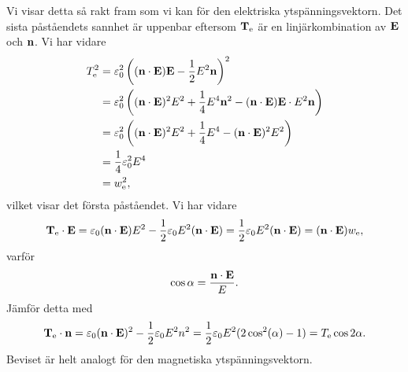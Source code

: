 Vi visar detta så rakt fram som vi kan för den elektriska ytspänningsvektorn. Det sista påståendets sannhet är uppenbar eftersom $\vb{T}_{\text{e}}$ är en linjärkombination av $\vb{E}$ och $\vb{n}$. Vi har vidare
\begin{align*}
	T_{\text{e}}^{2} &= \varepsilon_{0}^{2}\left((\vb{n}\cdot\vb{E})\vb{E} - \frac{1}{2}E^{2}\vb{n}\right)^{2} \\
	                 &= \varepsilon_{0}^{2}\left((\vb{n}\cdot\vb{E})^{2}E^{2} + \frac{1}{4}E^{4}\vb{n}^{2} - (\vb{n}\cdot\vb{E})\vb{E}\cdot E^{2}\vb{n}\right) \\
	                 &= \varepsilon_{0}^{2}\left((\vb{n}\cdot\vb{E})^{2}E^{2} + \frac{1}{4}E^{4} - (\vb{n}\cdot\vb{E})^{2}E^{2}\right) \\
	                 &= \frac{1}{4}\varepsilon_{0}^{2}E^{4} \\
	                 &= w_{\text{e}}^{2},
\end{align*}
vilket visar det första påståendet. Vi har vidare
\begin{align*}
	\vb{T}_{\text{e}}\cdot\vb{E} = \varepsilon_{0}(\vb{n}\cdot\vb{E})E^{2} - \frac{1}{2}\varepsilon_{0}E^{2}(\vb{n}\cdot\vb{E}) = \frac{1}{2}\varepsilon_{0}E^{2}(\vb{n}\cdot\vb{E}) = (\vb{n}\cdot\vb{E})w_{\text{e}},
\end{align*}
varför
\begin{align*}
	\cos{\alpha} = \frac{\vb{n}\cdot\vb{E}}{E}.
\end{align*}
Jämför detta med
\begin{align*}
	\vb{T}_{\text{e}}\cdot\vb{n} = \varepsilon_{0}(\vb{n}\cdot\vb{E})^{2} - \frac{1}{2}\varepsilon_{0}E^{2}n^{2} = \frac{1}{2}\varepsilon_{0}E^{2}(2\cos[2](\alpha) - 1) = T_{\text{e}}\cos{2\alpha}.
\end{align*}
Beviset är helt analogt för den magnetiska ytspänningsvektorn.

